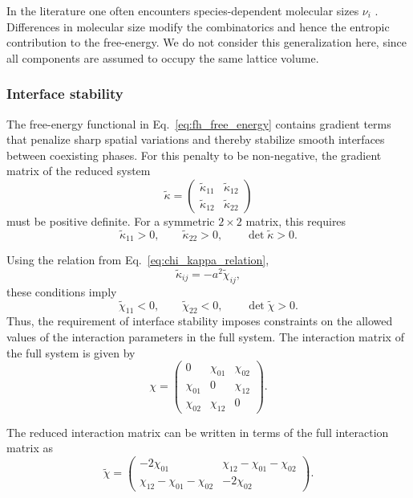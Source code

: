 \documentclass[12pt]{article}
\begin{document}
In the literature one often encounters species-dependent molecular sizes \(\nu_i\) \cite{Luo2025ChargeAsymmetry,Kirschbaum2021Controlling,zwicker2025physicsdropletregulationbiological}. Differences in molecular size modify the combinatorics and hence the entropic contribution to the free-energy. We do not consider this generalization here, since all components are assumed to occupy the same lattice volume.
\subsubsection{Interface stability}

The free-energy functional in Eq.~\eqref{eq:fh_free_energy} contains gradient terms that penalize sharp spatial variations and thereby stabilize smooth interfaces between coexisting phases. For this penalty to be non-negative, the gradient matrix of the reduced system
\[
\tilde{\kappa}=
\begin{pmatrix}
\tilde{\kappa}_{11} & \tilde{\kappa}_{12} \\
\tilde{\kappa}_{12} & \tilde{\kappa}_{22}
\end{pmatrix}
\]
must be positive definite. For a symmetric \(2\times2\) matrix, this requires
\[
\tilde{\kappa}_{11}>0,\qquad \tilde{\kappa}_{22}>0,\qquad \det\tilde{\kappa}>0.
\]

Using the relation from Eq.~\eqref{eq:chi_kappa_relation},
\[
\tilde{\kappa}_{ij}=-a^2\tilde{\chi}_{ij},
\]
these conditions imply
\[
\tilde{\chi}_{11}<0,\qquad \tilde{\chi}_{22}<0,\qquad \det\tilde{\chi}>0.
\]
Thus, the requirement of interface stability imposes constraints on the allowed values of the interaction parameters in the full system.
The interaction matrix of the full system is given by
\[
\chi=
\begin{pmatrix}0 & \chi_{01} & \chi_{02} \\
\chi_{01} & 0 & \chi_{12} \\
\chi_{02} & \chi_{12} &0 
\end{pmatrix}.
\]

The reduced interaction matrix can be written in terms of the full interaction matrix as
\begin{equation}
\tilde{\chi}=
\begin{pmatrix}
-2\chi_{01} & \chi_{12}-\chi_{01}-\chi_{02} \\
\chi_{12}-\chi_{01}-\chi_{02} & -2\chi_{02}
\end{pmatrix}.
\label{eq:reduced_chi}
\end{equation}
\end{document}
